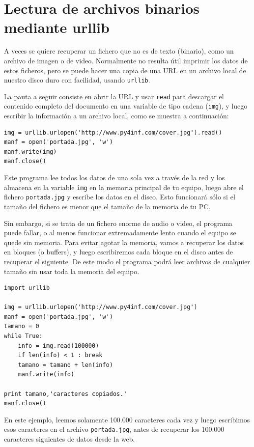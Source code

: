 \section{Lectura de archivos binarios mediante urllib}

A veces se quiere recuperar un fichero que no es de texto (binario), como
un archivo de imagen o de video. Normalmente no resulta útil imprimir los datos de
estos ficheros, pero se puede hacer una copia de una URL en un archivo
local de nuestro disco duro con facilidad, usando {\tt urllib}.

La pauta a seguir consiste en abrir la URL y usar {\tt read} para descargar el contenido
completo del documento en una variable de tipo cadena ({\tt img}), y luego escribir la
información a un archivo local, como se muestra a continuación:

\beforeverb
\begin{verbatim}
img = urllib.urlopen('http://www.py4inf.com/cover.jpg').read()
manf = open('portada.jpg', 'w')
manf.write(img)
manf.close()
\end{verbatim}
\afterverb
%
Este programa lee todos los datos de una sola vez a través de la red y los
almacena en la variable {\tt img} en la memoria principal de tu equipo,
luego abre el fichero {\tt portada.jpg} y escribe los datos en el
disco. Esto funcionará sólo si el tamaño del fichero es menor que el tamaño
de la memoria de tu PC.

Sin embargo, si se trata de un fichero enorme de audio o video, el programa puede fallar,
o al menos funcionar extremadamente lento cuando el equipo se quede sin memoria.
Para evitar agotar la memoria, vamos a recuperar los datos en bloques
(o buffers), y luego escribiremos cada bloque en el disco antes de recuperar
el siguiente. De este modo el programa podrá leer archivos de cualquier tamaño sin
usar toda la memoria del equipo.

\beforeverb
\begin{verbatim}
import urllib

img = urllib.urlopen('http://www.py4inf.com/cover.jpg')
manf = open('portada.jpg', 'w')
tamano = 0
while True:
    info = img.read(100000)
    if len(info) < 1 : break
    tamano = tamano + len(info)
    manf.write(info)

print tamano,'caracteres copiados.'
manf.close()
\end{verbatim}
\afterverb
%
En este ejemplo, leemos solamente 100.000 caracteres cada vez y luego
escribimos esos caracteres en el archivo {\tt portada.jpg},
antes de recuperar los 100.000 caracteres siguientes de datos desde
la web.

